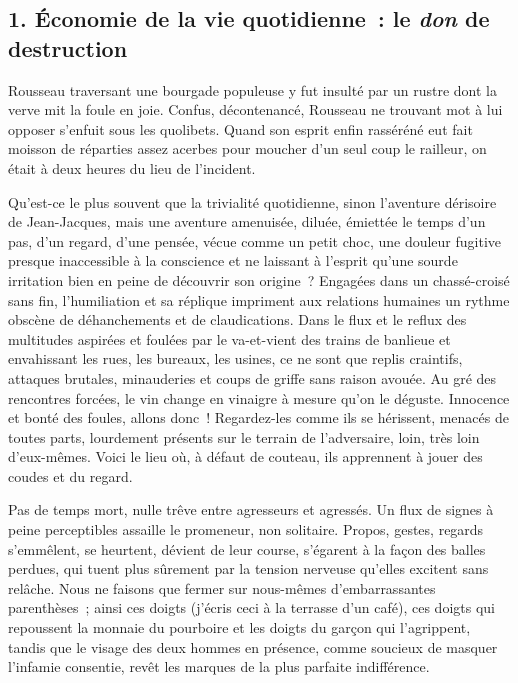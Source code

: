\documentclass[french,twoside]{book} %
\begin{document}
\subsection[{1. Économie de la vie quotidienne : le don de destruction}]{\textsc{1.} Économie de la vie quotidienne : le \emph{don} de destruction}
\noindent Rousseau traversant une bourgade populeuse y fut insulté par un rustre dont la verve mit la foule en joie. Confus, décontenancé, Rousseau ne trouvant mot à lui opposer s’enfuit sous les quolibets. Quand son esprit enfin rasséréné eut fait moisson de réparties assez acerbes pour moucher d’un seul coup le railleur, on était à deux heures du lieu de l’incident.\par
Qu’est-ce le plus souvent que la trivialité quotidienne, sinon l’aventure dérisoire de Jean-Jacques, mais une aventure amenuisée, diluée, émiettée le temps d’un pas, d’un regard, d’une pensée, vécue comme un petit choc, une douleur fugitive presque inaccessible à la conscience et ne laissant à l’esprit qu’une sourde irritation bien en peine de découvrir son origine ? Engagées dans un chassé-croisé sans fin, l’humiliation et sa réplique impriment aux relations humaines un rythme obscène de déhanchements et de claudications. Dans le flux et le reflux des multitudes aspirées et foulées par le va-et-vient des trains de banlieue et envahissant les rues, les bureaux, les usines, ce ne sont que replis craintifs, attaques brutales, minauderies et coups de griffe sans raison avouée. Au gré des rencontres forcées, le vin change en vinaigre à mesure qu’on le déguste. Innocence et bonté des foules, allons donc ! Regardez-les comme ils se hérissent, menacés de toutes parts, lourdement présents sur le terrain de l’adversaire, loin, très loin d’eux-mêmes. Voici le lieu où, à défaut de couteau, ils apprennent à jouer des coudes et du regard.\par
Pas de temps mort, nulle trêve entre agresseurs et agressés. Un flux de signes à peine perceptibles assaille le promeneur, non solitaire. Propos, gestes, regards s’emmêlent, se heurtent, dévient de leur course, s’égarent à la façon des balles perdues, qui tuent plus sûrement par la tension nerveuse qu’elles excitent sans relâche. Nous ne faisons que fermer sur nous-mêmes d’embarrassantes parenthèses ; ainsi ces doigts (j’écris ceci à la terrasse d’un café), ces doigts qui repoussent la monnaie du pourboire et les doigts du garçon qui l’agrippent, tandis que le visage des deux hommes en présence, comme soucieux de masquer l’infamie consentie, revêt les marques de la plus parfaite indifférence.\par
\end{document}
